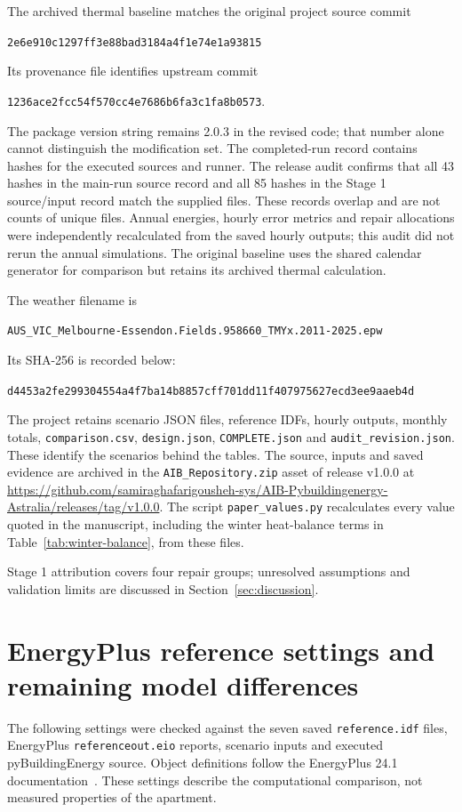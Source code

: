 The archived thermal baseline matches the original project source commit
\begin{center}\footnotesize\nolinkurl{2e6e910c1297ff3e88bad3184a4f1e74e1a93815}\end{center}
Its provenance file identifies upstream commit
\begin{center}\footnotesize\nolinkurl{1236ace2fcc54f570cc4e7686b6fa3c1fa8b0573}.\end{center}
The package version string remains 2.0.3 in the revised code; that number alone cannot distinguish the modification set. The completed-run record contains hashes for the executed sources and runner. The release audit confirms that all 43 hashes in the main-run source record and all 85 hashes in the Stage 1 source/input record match the supplied files. These records overlap and are not counts of unique files. Annual energies, hourly error metrics and repair allocations were independently recalculated from the saved hourly outputs; this audit did not rerun the annual simulations. The original baseline uses the shared calendar generator for comparison but retains its archived thermal calculation.

The weather filename is
\begin{center}\footnotesize\nolinkurl{AUS_VIC_Melbourne-Essendon.Fields.958660_TMYx.2011-2025.epw}\end{center}
Its SHA-256 is recorded below:
\begin{center}\footnotesize\nolinkurl{d4453a2fe299304554a4f7ba14b8857cff701dd11f407975627ecd3ee9aaeb4d}\end{center}
The project retains scenario JSON files, reference IDFs, hourly outputs, monthly totals, \nolinkurl{comparison.csv}, \nolinkurl{design.json}, \nolinkurl{COMPLETE.json} and \nolinkurl{audit_revision.json}. These identify the scenarios behind the tables. The source, inputs and saved evidence are archived in the \nolinkurl{AIB_Repository.zip} asset of release v1.0.0 at \url{https://github.com/samiraghafarigousheh-sys/AIB-Pybuildingenergy-Astralia/releases/tag/v1.0.0}. The script \nolinkurl{paper_values.py} recalculates every value quoted in the manuscript, including the winter heat-balance terms in Table~\ref{tab:winter-balance}, from these files.

Stage 1 attribution covers four repair groups; unresolved assumptions and validation limits are discussed in Section~\ref{sec:discussion}.

\section{EnergyPlus reference settings and remaining model differences}
\label{app:ep_alignment}
The following settings were checked against the seven saved \nolinkurl{reference.idf} files, EnergyPlus \nolinkurl{referenceout.eio} reports, scenario inputs and executed pyBuildingEnergy source. Object definitions follow the EnergyPlus 24.1 documentation~\cite{energyplus}. These settings describe the computational comparison, not measured properties of the apartment.

